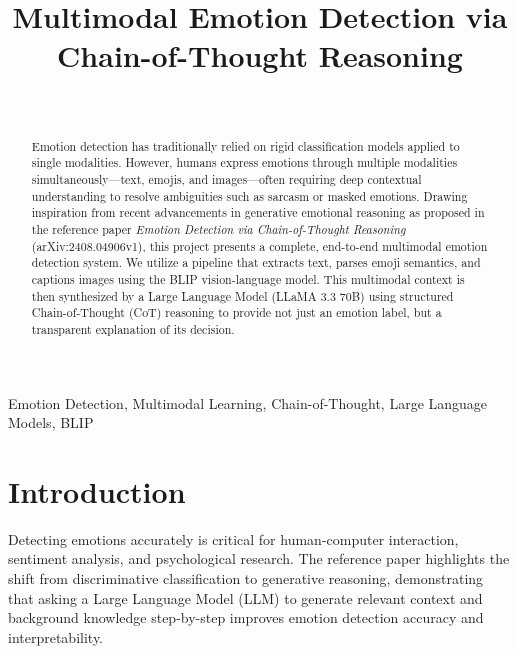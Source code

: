 \documentclass[11pt, conference, a4paper]{IEEEtran}
\begin{document}
\title{Multimodal Emotion Detection via Chain-of-Thought Reasoning}

\author{
 \\
}

\maketitle

\begin{abstract}
Emotion detection has traditionally relied on rigid classification models applied to single modalities. However, humans express emotions through multiple modalities simultaneously—text, emojis, and images—often requiring deep contextual understanding to resolve ambiguities such as sarcasm or masked emotions. Drawing inspiration from recent advancements in generative emotional reasoning as proposed in the reference paper \textit{Emotion Detection via Chain-of-Thought Reasoning} (arXiv:2408.04906v1), this project presents a complete, end-to-end multimodal emotion detection system. We utilize a pipeline that extracts text, parses emoji semantics, and captions images using the BLIP vision-language model. This multimodal context is then synthesized by a Large Language Model (LLaMA 3.3 70B) using structured Chain-of-Thought (CoT) reasoning to provide not just an emotion label, but a transparent explanation of its decision.
\end{abstract}

\begin{IEEEkeywords}
Emotion Detection, Multimodal Learning, Chain-of-Thought, Large Language Models, BLIP
\end{IEEEkeywords}

\section{Introduction}
Detecting emotions accurately is critical for human-computer interaction, sentiment analysis, and psychological research. The reference paper highlights the shift from discriminative classification to generative reasoning, demonstrating that asking a Large Language Model (LLM) to generate relevant context and background knowledge step-by-step improves emotion detection accuracy and interpretability.
\end{document}
